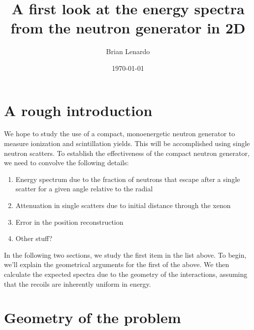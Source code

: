 \documentclass{article}
\title{A first look at the energy spectra from the neutron generator in 2D} %
\author{Brian Lenardo} %
\date{\today} %
\begin{document}
\maketitle %



\section{A rough introduction}
We hope to study the use of a compact, monoenergetic neutron generator to measure ionization and scintillation yields. This will be accomplished using single neutron scatters. To establish the effectiveness of the compact neutron generator, we need to convolve the following details:
\begin{enumerate}
\item Energy spectrum due to the fraction of neutrons that escape after a single scatter for a given angle relative to the radial
\item Attenuation in single scatters due to initial distance through the xenon
\item Error in the position reconstruction
\item Other stuff?
\end{enumerate}

In the following two sections, we study the first item in the list above. To begin, we'll explain the geometrical arguments for the first of the above. We then calculate the expected spectra due to the geometry of the interactions, assuming that the recoils are inherently uniform in energy.

\section{Geometry of the problem}
\end{document}

